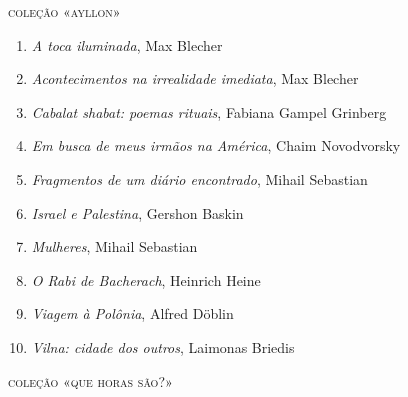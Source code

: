 \medskip
{\large\textsc{coleção «ayllon»}}



\begin{enumerate}
\setlength{\topsep}{2pt}
\setlength{\partopsep}{0pt}
\setlength\parskip{4.2pt}
\setlength\itemsep{-1.4mm}
\item \textit{A toca iluminada}, Max Blecher
\item \textit{Acontecimentos na irrealidade imediata}, Max Blecher
\item \textit{Cabalat shabat: poemas rituais}, Fabiana Gampel Grinberg
\item \textit{Em busca de meus irmãos na América}, Chaim Novodvorsky
\item \textit{Fragmentos de um diário encontrado}, Mihail Sebastian
\item \textit{Israel e Palestina}, Gershon Baskin
\item \textit{Mulheres}, Mihail Sebastian
\item \textit{O Rabi de Bacherach}, Heinrich Heine
\item \textit{Viagem à Polônia}, Alfred Döblin
\item \textit{Vilna: cidade dos outros}, Laimonas Briedis
\end{enumerate}


\medskip
{\large\textsc{coleção «que horas são?»}}


